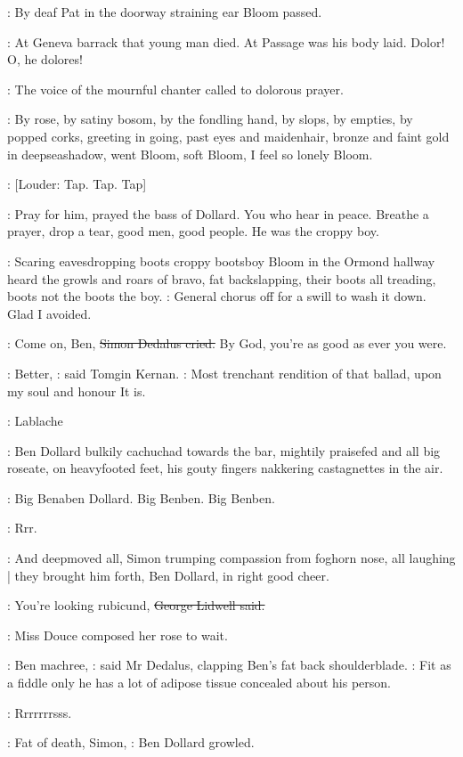 :
By deaf Pat in the doorway
straining ear Bloom passed.

\BloomInt:
At Geneva barrack that young man died. At Passage was his body
laid. Dolor! O, he dolores!

:
The voice of the mournful chanter called to
dolorous prayer.

:
By rose, by satiny bosom, by the fondling hand, by slops, by empties,
by popped corks, greeting in going, past eyes and maidenhair, bronze and
faint gold in deepseashadow, went Bloom, soft Bloom, I feel so lonely
Bloom.

\stripling:
[Louder: Tap. Tap. Tap]

:
Pray for him, prayed the bass of Dollard. You who hear in peace. Breathe
a prayer, drop a tear, good men, good people.
He was the croppy boy.

:
Scaring eavesdropping boots croppy bootsboy Bloom in the Ormond
hallway heard the growls and roars of bravo, fat backslapping, their boots
all treading, boots not the boots the boy.
\BloomInt:
General chorus off for a swill
to wash it down. Glad I avoided.

\simon:
Come on, Ben,
\sout{Simon Dedalus cried.}
By God, you're as good as ever you were.

:
Better,
:
said Tomgin Kernan.
:
Most trenchant rendition of that ballad,
upon my soul and honour It is.

\cowley:
Lablache

:
Ben Dollard bulkily cachuchad towards the bar, mightily praisefed and all
big roseate, on heavyfooted feet, his gouty fingers nakkering castagnettes
in the air.

\BloomInt:
Big Benaben Dollard.
Big Benben.
Big Benben.

\BloomInt:
Rrr.

:
And deepmoved all,
Simon trumping compassion from foghorn nose,
all laughing |
they brought him forth,
Ben Dollard,
in right good cheer.

\lidwell:
You're looking rubicund,
\sout{George Lidwell said.}

:
Miss Douce composed her rose to wait.

\simon:
Ben machree,
:
said Mr Dedalus, clapping Ben's fat back shoulderblade.
\simon:
Fit as a fiddle only he has a lot of adipose tissue concealed about his
person.

\BloomInt:
Rrrrrrrsss.

\dollard:
Fat of death, Simon,
:
Ben Dollard growled.

